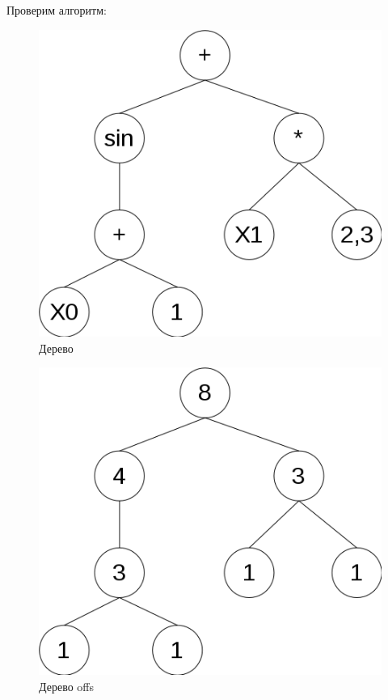 \clearpage
Проверим алгоритм:


\begin{figure}[!h]
\centering
\includegraphics[scale=0.4]{research/pics/10.png}
\caption{Дерево}
\label{figure:offsTree1}
\end{figure}
\begin{figure}[!h]
\centering
\includegraphics[scale=0.4]{research/pics/11.png}
\caption{Дерево offs}
\label{figure:offsTree2}
\end{figure}

